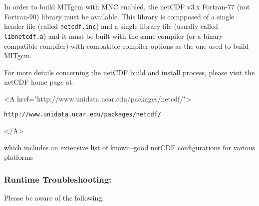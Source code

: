 In order to build MITgcm with MNC enabled, the netCDF v3.x Fortran-77
(not Fortran-90) library must be available.  This library is compposed
of a single header file (called \texttt{netcdf.inc}) and a single
library file (usually called \texttt{libnetcdf.a}) and it must be
built with the same compiler (or a binary-compatible compiler) with
compatible compiler options as the one used to build MITgcm.

For more details concerning the netCDF build and install process,
please visit the netCDF home page at:
\begin{rawhtml} <A href="http://www.unidata.ucar.edu/packages/netcdf/"> \end{rawhtml}
\begin{verbatim}
http://www.unidata.ucar.edu/packages/netcdf/
\end{verbatim}
\begin{rawhtml} </A> \end{rawhtml} 
which includes an extensive list of known--good netCDF configurations
for various platforms

\subsubsection{Runtime Troubleshooting:}

Please be aware of the following:

